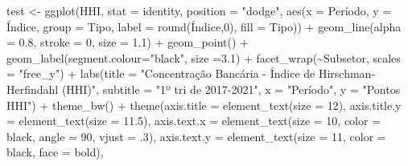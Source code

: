 \documentclass[
]{article}
\newenvironment{Shaded}{\begin{snugshade}}{\end{snugshade}}
\newcommand{\AttributeTok}[1]{\textcolor[rgb]{0.77,0.63,0.00}{#1}}
\newcommand{\DecValTok}[1]{\textcolor[rgb]{0.00,0.00,0.81}{#1}}
\newcommand{\FloatTok}[1]{\textcolor[rgb]{0.00,0.00,0.81}{#1}}
\newcommand{\FunctionTok}[1]{\textcolor[rgb]{0.00,0.00,0.00}{#1}}
\newcommand{\NormalTok}[1]{#1}
\newcommand{\OtherTok}[1]{\textcolor[rgb]{0.56,0.35,0.01}{#1}}
\newcommand{\SpecialCharTok}[1]{\textcolor[rgb]{0.00,0.00,0.00}{#1}}
\newcommand{\StringTok}[1]{\textcolor[rgb]{0.31,0.60,0.02}{#1}}
\begin{document}
\begin{Shaded}
\begin{Highlighting}[]
\NormalTok{test }\OtherTok{\textless{}{-}}
\FunctionTok{ggplot}\NormalTok{(HHI, }\AttributeTok{stat =} \StringTok{\textquotesingle{}identity\textquotesingle{}}\NormalTok{, }\AttributeTok{position =} \StringTok{"dodge"}\NormalTok{, }
  \FunctionTok{aes}\NormalTok{(}\AttributeTok{x =}\NormalTok{ Período, }\AttributeTok{y =}\NormalTok{ Índice, }\AttributeTok{group =}\NormalTok{ Tipo, }\AttributeTok{label =} \FunctionTok{round}\NormalTok{(Índice,}\DecValTok{0}\NormalTok{), }\AttributeTok{fill =}\NormalTok{ Tipo)) }\SpecialCharTok{+}
  \FunctionTok{geom\_line}\NormalTok{(}\AttributeTok{alpha =} \FloatTok{0.8}\NormalTok{, }\AttributeTok{stroke =} \DecValTok{0}\NormalTok{, }\AttributeTok{size =} \FloatTok{1.1}\NormalTok{) }\SpecialCharTok{+}
  \FunctionTok{geom\_point}\NormalTok{() }\SpecialCharTok{+}
  \FunctionTok{geom\_label}\NormalTok{(}\AttributeTok{segment.colour=}\StringTok{"black"}\NormalTok{, }\AttributeTok{size =}\FloatTok{3.1}\NormalTok{) }\SpecialCharTok{+} 
  \FunctionTok{facet\_wrap}\NormalTok{(}\SpecialCharTok{\textasciitilde{}}\NormalTok{Subsetor, }\AttributeTok{scales =} \StringTok{"free\_y"}\NormalTok{) }\SpecialCharTok{+}
\FunctionTok{labs}\NormalTok{(}\AttributeTok{title =} \StringTok{"Concentração Bancária {-} Índice de Hirschman{-}Herfindahl (HHI)"}\NormalTok{, }
     \AttributeTok{subtitle =} \StringTok{"1º tri de 2017{-}2021"}\NormalTok{,}
     \AttributeTok{x =} \StringTok{"Período"}\NormalTok{,}
     \AttributeTok{y =} \StringTok{"Pontos HHI"}\NormalTok{) }\SpecialCharTok{+}
  \FunctionTok{theme\_bw}\NormalTok{() }\SpecialCharTok{+}
        \FunctionTok{theme}\NormalTok{(}\AttributeTok{axis.title =} \FunctionTok{element\_text}\NormalTok{(}\AttributeTok{size =} \DecValTok{12}\NormalTok{),}
        \AttributeTok{axis.title.y =} \FunctionTok{element\_text}\NormalTok{(}\AttributeTok{size =} \FloatTok{11.5}\NormalTok{),                 }
        \AttributeTok{axis.text.x =} \FunctionTok{element\_text}\NormalTok{(}\AttributeTok{size =} \DecValTok{10}\NormalTok{, }\AttributeTok{color =} \StringTok{\textquotesingle{}black\textquotesingle{}}\NormalTok{, }\AttributeTok{angle =} \DecValTok{90}\NormalTok{, }\AttributeTok{vjust =}\NormalTok{ .}\DecValTok{3}\NormalTok{),}
        \AttributeTok{axis.text.y =} \FunctionTok{element\_text}\NormalTok{(}\AttributeTok{size =} \DecValTok{11}\NormalTok{, }\AttributeTok{color =} \StringTok{\textquotesingle{}black\textquotesingle{}}\NormalTok{, }\AttributeTok{face =} \StringTok{\textquotesingle{}bold\textquotesingle{}}\NormalTok{),}

\end{Highlighting}
\end{Shaded}
\end{document}
